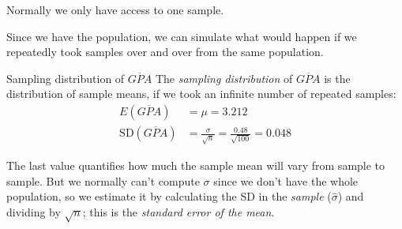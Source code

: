 \documentclass{beamer}\usepackage[]{graphicx}\usepackage[]{color}
\makeatletter
\newcommand{\hlnum}[1]{\textcolor[rgb]{0.824,0.412,0.118}{#1}}%
\newcommand{\hlstr}[1]{\textcolor[rgb]{1,0.894,0.71}{#1}}%
\newcommand{\hlopt}[1]{\textcolor[rgb]{1,0.894,0.769}{#1}}%
\newcommand{\hlstd}[1]{\textcolor[rgb]{1,0.894,0.769}{#1}}%
\newcommand{\hlkwb}[1]{\textcolor[rgb]{0.804,0.776,0.451}{#1}}%
\newcommand{\hlkwc}[1]{\textcolor[rgb]{0.78,0.941,0.545}{#1}}%
\newcommand{\hlkwd}[1]{\textcolor[rgb]{1,0.78,0.769}{#1}}%
\newenvironment{kframe}{%
 \def\at@end@of@kframe{}%
 \ifinner\ifhmode%
  \def\at@end@of@kframe{\end{minipage}}%
  \begin{minipage}{\columnwidth}%
 \fi\fi%
 \def\FrameCommand##1{\hskip\@totalleftmargin \hskip-\fboxsep
 \colorbox{shadecolor}{##1}\hskip-\fboxsep
     \hskip-\linewidth \hskip-\@totalleftmargin \hskip\columnwidth}%
 \MakeFramed {\advance\hsize-\width
   \@totalleftmargin\z@ \linewidth\hsize
   \@setminipage}}%
 {\par\unskip\endMakeFramed%
 \at@end@of@kframe}
\newenvironment{knitrout}{}{} %
\makeatother
\begin{document}
\begin{darkframes}
    \begin{frame}
      \begin{center}
        Normally we only have access to one sample. 
        
        \pause\vspace{2em}
        Since we have the population, we can \alert{simulate} what would happen if we repeatedly took samples over and over from the same population.
      \end{center}
    \end{frame}  

      
      
    \begin{frame}[fragile]{Sampling distribution of $\overline{GPA}$}
      The \emph{sampling distribution} of $\overline{GPA}$ is the distribution of sample means, if we took an infinite number of repeated samples:      
      \begin{align*}
        E(\overline{GPA}) &= \mu = 3.212 \\
        \text{SD}(\overline{GPA}) &= \frac{\sigma}{\sqrt n} = \frac{0.48}{\sqrt{100}} = 0.048
      \end{align*}
      
      The last value quantifies how much the sample mean will vary from sample to sample. But we normally can't compute $\sigma$ since we don't have the whole population, so we estimate it by calculating the SD in the \emph{sample} ($\hat\sigma$) and dividing by $\sqrt n$; this is the \emph{standard error of the mean}.
    \end{frame}
      

\end{darkframes}
\end{document}
